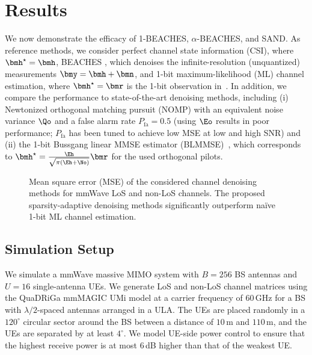 \section{Results}
\label{sec:simulations}

We now demonstrate the efficacy of 1-BEACHES, $\alpha$-BEACHES, and SAND. 
%
As reference methods, we consider perfect channel state information (CSI), where $\bmh^\star= \bmh$,  BEACHES \cite{ghods19a}, which denoises the infinite-resolution (unquantized) measurements $\bmy = \bmh+\bmn$, and 1-bit maximum-likelihood (ML) channel estimation, where $\bmh^\star = \bmr$ is the 1-bit observation in~. In addition, we compare the performance to state-of-the-art denoising methods, including (i) Newtonized orthogonal matching pursuit (NOMP) \cite{mamandipoor16} with an equivalent noise variance $\Qo$  and a false alarm rate $P_\text{fa}=0.5$ (using $\Eo$ results in poor performance; $P_\text{fa}$ has been tuned to achieve low MSE at low and high SNR)
%
and (ii) the 1-bit Bussgang linear MMSE  estimator (BLMMSE)~\cite{li16a,li17b}, which corresponds to $\bmh^\star = \frac{\Eh}{\sqrt{\pi(\Eh+\No)}}\bmr$ for the used orthogonal pilots.




\begin{figure}[tp]
	\centering
	\vspace{-0.1cm}
	\caption{Mean square error (MSE) of the considered channel denoising methods for mmWave LoS and non-LoS channels. The proposed sparsity-adaptive denoising methods significantly outperform na\"ive 1-bit ML channel estimation.}
	\label{fig:MSE}
\end{figure}


\subsection{Simulation Setup}
We simulate a mmWave massive MIMO system with $B=256$ BS antennas and $U=16$ single-antenna UEs. 
%
We generate LoS and non-LoS channel matrices using the QuaDRiGa mmMAGIC UMi model \cite{jaeckel2019quadriga} at a carrier frequency of $60$\,GHz for a BS with $\lambda/2$-spaced antennas arranged in a ULA. 
%
The UEs are placed randomly in a $120^\circ$ circular sector around the BS between a distance of $10$\,m and $110$\,m, and the UEs are separated by at least $4^\circ$. 
%
We model UE-side power control to ensure that the highest receive power is at most $6$\,dB higher than that of the weakest UE. 



